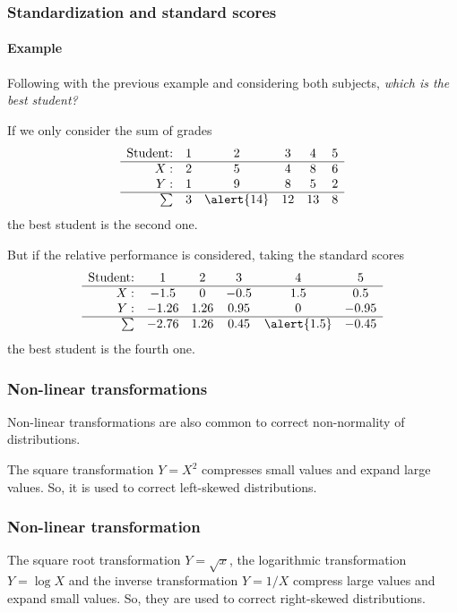 \begin{frame}
\frametitle{Standardization and standard scores}
\framesubtitle{Example}
Following with the previous example and considering both subjects, \emph{which is the best student?}

If we only consider the sum of grades
\[
\begin{array}{rccccc}
\mbox{Student:} & 1 & 2 & 3 & 4 & 5\\ \hline
X: & 2 & 5 & 4 & 8 & 6 \\
Y: & 1 & 9 & 8 & 5 & 2 \\ \hline
\sum & 3 & \alert{14} & 12 & 13 & 8
\end{array}
\]
the best student is the second one. 

But if the relative performance is considered, taking the standard scores 
\[
\begin{array}{rccccc}
\mbox{Student:} & 1 & 2 & 3 & 4 & 5\\ \hline
X: & -1.5 & 0 & -0.5 & 1.5 & 0.5 \\
Y: & -1.26 & 1.26 & 0.95 & 0 & -0.95\\ \hline
\sum & -2.76 & 1.26 & 0.45 & \alert{1.5} & -0.45
\end{array}
\]
the best student is the fourth one. 
\end{frame}


\begin{frame}
\frametitle{Non-linear transformations}
Non-linear transformations are also common to correct non-normality of distributions.

The square transformation $Y=X^2$ compresses small values and expand large values.
So, it is used to correct left-skewed distributions.

\begin{center}
\scalebox{0.4}{}
\end{center} 
\end{frame}


\begin{frame}
\frametitle{Non-linear transformation}
The square root transformation $Y=\sqrt x$, the logarithmic transformation $Y= \log X$ and the inverse transformation $Y=1/X$ compress large values and expand small values.
So, they are used to correct right-skewed distributions. 
\begin{center}
\scalebox{0.4}{}
\end{center} 
\end{frame}


